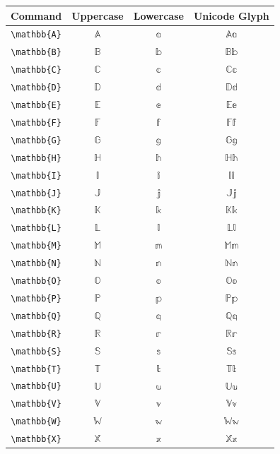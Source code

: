 \documentclass[12pt,a4paper]{article}
\begin{document}
\begin{longtable}{|c|c|c|c|}
\hline
\textbf{Command} & \textbf{Uppercase} & \textbf{Lowercase} & \textbf{Unicode Glyph} \\
\hline
\verb|\mathbb{A}| & $\mathbb{A}$ & $\mathbb{a}$ & $ 𝔸 𝕒 $ \\
\verb|\mathbb{B}| & $\mathbb{B}$ & $\mathbb{b}$ & $ 𝔹 𝕓 $ \\
\verb|\mathbb{C}| & $\mathbb{C}$ & $\mathbb{c}$ & $ ℂ 𝕔 $ \\
\verb|\mathbb{D}| & $\mathbb{D}$ & $\mathbb{d}$ & $ 𝔻 𝕕 $ \\
\verb|\mathbb{E}| & $\mathbb{E}$ & $\mathbb{e}$ & $ 𝔼 𝕖 $ \\
\verb|\mathbb{F}| & $\mathbb{F}$ & $\mathbb{f}$ & $ 𝔽 𝕗 $ \\
\verb|\mathbb{G}| & $\mathbb{G}$ & $\mathbb{g}$ & $ 𝔾 𝕘 $ \\
\verb|\mathbb{H}| & $\mathbb{H}$ & $\mathbb{h}$ & $ ℍ 𝕙 $ \\
\verb|\mathbb{I}| & $\mathbb{I}$ & $\mathbb{i}$ & $ 𝕀 𝕚 $ \\
\verb|\mathbb{J}| & $\mathbb{J}$ & $\mathbb{j}$ & $ 𝕁 𝕛 $ \\
\verb|\mathbb{K}| & $\mathbb{K}$ & $\mathbb{k}$ & $ 𝕂 𝕜 $ \\
\verb|\mathbb{L}| & $\mathbb{L}$ & $\mathbb{l}$ & $ 𝕃 𝕝 $ \\
\verb|\mathbb{M}| & $\mathbb{M}$ & $\mathbb{m}$ & $ 𝕄 𝕞 $ \\
\verb|\mathbb{N}| & $\mathbb{N}$ & $\mathbb{n}$ & $ ℕ 𝕟 $ \\
\verb|\mathbb{O}| & $\mathbb{O}$ & $\mathbb{o}$ & $ 𝕆 𝕠 $ \\
\verb|\mathbb{P}| & $\mathbb{P}$ & $\mathbb{p}$ & $ ℙ 𝕡 $ \\
\verb|\mathbb{Q}| & $\mathbb{Q}$ & $\mathbb{q}$ & $ ℚ 𝕢 $ \\
\verb|\mathbb{R}| & $\mathbb{R}$ & $\mathbb{r}$ & $ ℝ 𝕣 $ \\
\verb|\mathbb{S}| & $\mathbb{S}$ & $\mathbb{s}$ & $ 𝕊 𝕤 $ \\
\verb|\mathbb{T}| & $\mathbb{T}$ & $\mathbb{t}$ & $ 𝕋 𝕥 $ \\
\verb|\mathbb{U}| & $\mathbb{U}$ & $\mathbb{u}$ & $ 𝕌 𝕦 $ \\
\verb|\mathbb{V}| & $\mathbb{V}$ & $\mathbb{v}$ & $ 𝕍 𝕧 $ \\
\verb|\mathbb{W}| & $\mathbb{W}$ & $\mathbb{w}$ & $ 𝕎 𝕨 $ \\
\verb|\mathbb{X}| & $\mathbb{X}$ & $\mathbb{x}$ & $ 𝕏 𝕩 $ \\

\end{longtable}
\end{document}
